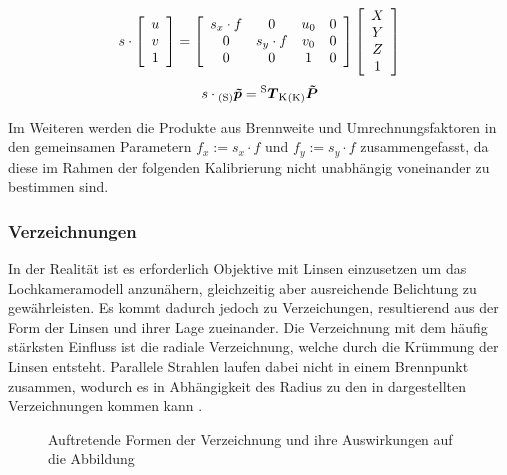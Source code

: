 \begin{equation}
s \cdot 
\mat{c}{
u\\
v\\
1
}
= 
\mat{cccc}{
s_x \cdot f & 0 & u_0 & 0\\
0 & s_y \cdot f & v_0 & 0\\
0 & 0 & 1 & 0
}
\mat{c}{
X\\
Y\\
Z\\
1
}
\label{eq.intrinsic}
\end{equation}
\begin{equation}
s \cdot {_{{\mathrm{(S)}}}}\mbox{\boldmath{$\tilde{p}$}} = {^{\mathrm{S}}\mbox{\boldmath{$T$}}_{\mathrm{K}}}{_{{\mathrm{(K)}}}}\mbox{\boldmath{$\tilde{P}$}}
\end{equation}

Im Weiteren werden die Produkte aus Brennweite und Umrechnungsfaktoren in den gemeinsamen Parametern $f_x := s_x \cdot f$ und $f_y := s_y \cdot f$ zusammengefasst, da diese im Rahmen der folgenden Kalibrierung nicht unabhängig voneinander zu bestimmen sind.

\subsubsection{Verzeichnungen}
In der Realität ist es erforderlich Objektive mit Linsen einzusetzen um das Lochkameramodell anzunähern, gleichzeitig aber ausreichende Belichtung zu gewährleisten. Es kommt dadurch jedoch zu Verzeichungen, resultierend aus der Form der Linsen und ihrer Lage zueinander. Die Verzeichnung mit dem häufig stärksten Einfluss ist die radiale Verzeichnung, welche durch die Krümmung der Linsen entsteht. Parallele Strahlen laufen dabei nicht in einem Brennpunkt zusammen, wodurch es in Abhängigkeit des Radius zu den in  dargestellten Verzeichnungen kommen kann \cite{Hertzberg2012}.

\begin{figure}[!ht]
	\begin{center}
	\hspace{4mm}
	\hspace{4mm}
	\caption{Auftretende Formen der Verzeichnung und ihre Auswirkungen auf die Abbildung}
	\label{fig.distortions}
	\end{center}
\end{figure}

